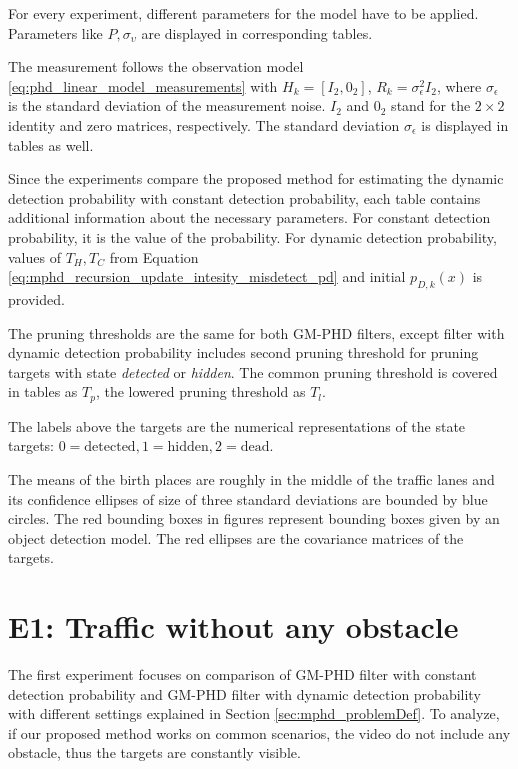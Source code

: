 For every experiment, different parameters for the model have to be applied. Parameters like $P, \sigma_{\upsilon}$
are displayed in corresponding tables.

The measurement follows the observation model \eqref{eq:phd_linear_model_measurements} with $H_k = [I_2, 0_2]$, $R_k
= \sigma_{\epsilon}^2I_2$, where $ \sigma_{\epsilon}$ is the standard deviation of the measurement noise.  $I_2$ and $0_2$ stand for
the $2\times 2$ identity and zero matrices, respectively.
The standard deviation $\sigma_{\epsilon}$ is displayed in tables as well.

Since the experiments compare the proposed method for estimating the dynamic detection probability with constant
detection probability, each table contains additional information about the necessary parameters. For constant
detection probability, it is the value of the probability. For dynamic detection probability, values of $T_H, T_C$
from Equation \eqref{eq:mphd_recursion_update_intesity_misdetect_pd}
and initial $p_{D,k}(x)$ is provided.

The pruning thresholds are the same for both GM-PHD filters, except filter with dynamic detection probability
includes second pruning threshold for pruning targets with state \textit{detected} or \textit{hidden}. The common
pruning threshold is covered in tables as $T_p$, the lowered pruning threshold as $T_l$.

The labels above
the targets are the numerical representations of the state targets: $0=\text{detected}, 1=\text{hidden}, 2=\text{dead}$.

The means of the birth places are roughly in the middle of the traffic lanes and its confidence ellipses of size of
three standard
deviations are bounded by blue circles. The red bounding boxes in figures represent bounding
boxes
given by an object detection model. The red ellipses are the covariance matrices of the targets.


\section{E1: Traffic without any obstacle}
The first experiment focuses on comparison of GM-PHD filter with constant detection probability and GM-PHD filter
with dynamic detection probability with different settings explained in Section \ref{sec:mphd_problemDef}. To analyze,
if our proposed method works on common scenarios, the video do not include any obstacle, thus the targets are
constantly visible.

